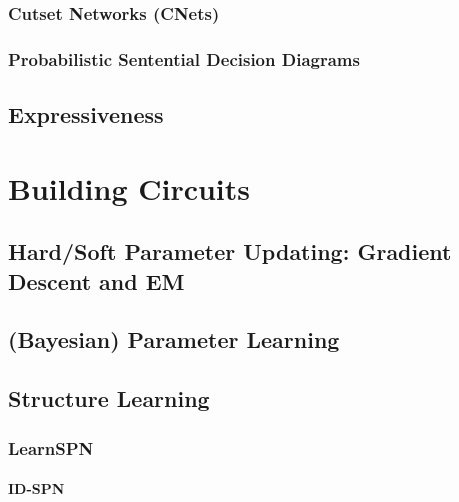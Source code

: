 			\subsubsection{Cutset Networks (CNets)} %

			\subsubsection{Probabilistic Sentential Decision Diagrams} %

		\subsection{Expressiveness} %

	\section{Building Circuits} %

		\subsection{Hard/Soft Parameter Updating: Gradient Descent and EM} %

		\subsection{(Bayesian) Parameter Learning} %

		\subsection{Structure Learning} %

			\subsubsection{LearnSPN} %

				\paragraph{ID-SPN} %


